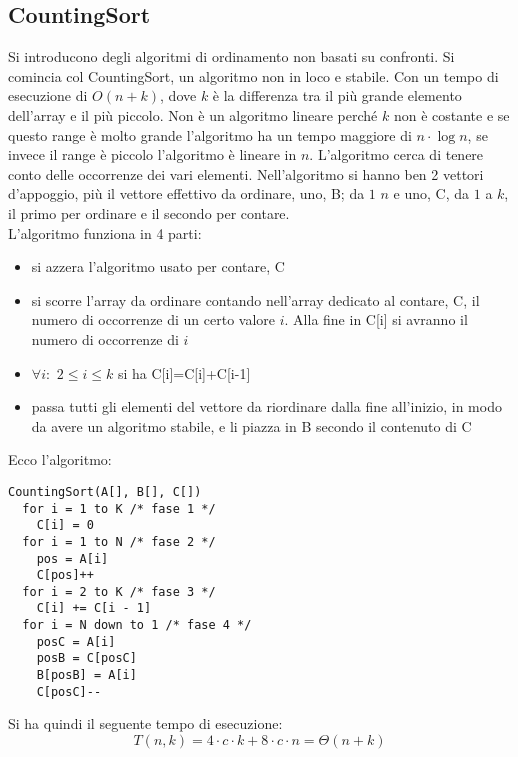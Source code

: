 \documentclass[a4paper,12pt,oneside,tikz]{book}
\begin{document}
\subsection{CountingSort}
Si introducono degli algoritmi di ordinamento non basati su confronti. Si comincia col CountingSort, un algoritmo non in loco e stabile. Con un tempo di esecuzione di $O(n+k)$, dove $k$ è la differenza tra il più grande elemento dell'array e il più piccolo. Non è un algoritmo lineare perché $k$ non è costante e se questo range è molto grande l'algoritmo ha un tempo maggiore di $n\cdot \log n$, se invece il range è piccolo l'algoritmo è lineare in $n$. L'algoritmo cerca di tenere conto delle occorrenze dei vari elementi. Nell'algoritmo si hanno ben 2 vettori d'appoggio, più il vettore effettivo da ordinare, uno, B; da $1$ $n$ e uno, C, da $1$ a $k$, il primo per ordinare e il secondo per contare.\\ L'algoritmo funziona in 4 parti:
\begin{itemize}
	\item si azzera l'algoritmo usato per contare, C
	\item si scorre l'array da ordinare contando nell'array dedicato al contare, C, il numero di occorrenze di un certo valore $i$. Alla fine in C[i] si avranno il numero di occorrenze di $i$
	\item $\forall i:\,\, 2\leq i\leq k$ si ha C[i]=C[i]+C[i-1]
	\item passa tutti gli elementi del vettore da riordinare dalla fine all'inizio, in modo da avere un algoritmo stabile, e li piazza in B secondo il contenuto di C
\end{itemize}
Ecco l'algoritmo:
\begin{verbatim}
CountingSort(A[], B[], C[])
  for i = 1 to K /* fase 1 */
    C[i] = 0
  for i = 1 to N /* fase 2 */
    pos = A[i]
    C[pos]++
  for i = 2 to K /* fase 3 */
    C[i] += C[i - 1]
  for i = N down to 1 /* fase 4 */
    posC = A[i]
    posB = C[posC]
    B[posB] = A[i]
    C[posC]--
\end{verbatim}
Si ha quindi il seguente tempo di esecuzione:
$$
	T(n,k)=4\cdot c \cdot k+8\cdot c\cdot n=\Theta(n+k)$$
\end{document}
